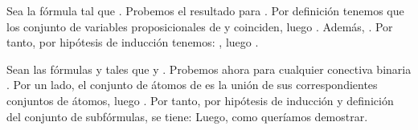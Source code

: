 \begin{isabellebody}
\begin{isamarkuptext}
\begin{demostracion}
    Sea la fórmula  tal que . Probemos el resultado 
    para . Por definición tenemos que los conjunto de variables 
    proposicionales de  y  coinciden, luego . Además, 
    . Por tanto, por hipótesis de 
    inducción tenemos:
    , luego
    .

    Sean las fórmulas  y  tales que  y 
    . Probemos ahora  para cualquier 
    conectiva binaria \isa{{\isacharasterisk}}. Por un lado, el conjunto de átomos de 
    es la unión de sus correspondientes conjuntos de átomos, luego 
    . Por tanto, por hipótesis de inducción y definición 
    del conjunto de subfórmulas, se tiene:
    Luego,  como queríamos demostrar.  
  \end{demostracion}


\end{isamarkuptext}
\end{isabellebody}
